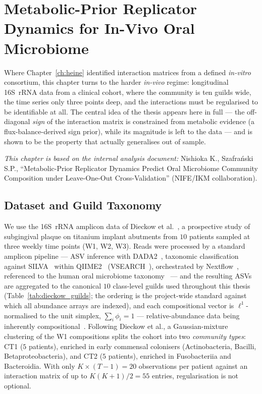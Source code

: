 \chapter{Metabolic-Prior Replicator Dynamics for In-Vivo Oral Microbiome}
\label{ch:dieckow}

Where Chapter~\ref{ch:heine} identified interaction matrices from a defined
\emph{in-vitro} consortium, this chapter turns to the harder \emph{in-vivo}
regime: longitudinal 16S~rRNA data from a clinical cohort, where the community is
ten guilds wide, the time series only three points deep, and the interactions must
be regularised to be identifiable at all. The central idea of the thesis appears
here in full --- the off-diagonal \emph{sign} of the interaction matrix is
constrained from metabolic evidence (a flux-balance-derived sign prior), while its
magnitude is left to the data --- and is shown to be the property that actually
generalises out of sample.

\medskip\noindent\textit{This chapter is based on the internal analysis document:}
Nishioka K., Szafra\'{n}ski S.P., ``Metabolic-Prior Replicator Dynamics Predict
Oral Microbiome Community Composition under Leave-One-Out Cross-Validation''
(NIFE/IKM collaboration).

\section{Dataset and Guild Taxonomy}
\label{sec:dieckow_data}

We use the 16S~rRNA amplicon data of Dieckow et al.~\cite{dieckow2024}, a
prospective study of subgingival plaque on titanium implant abutments from
$10$ patients sampled at three weekly time points (W1, W2, W3). Reads were
processed by a standard amplicon pipeline --- ASV inference with DADA2~\cite{Callahan2016DADA2},
taxonomic classification against SILVA~\cite{Quast2013SILVA, Bokulich2018FeatureClassifier, Robeson2021RESCRIPt} within
QIIME2~\cite{Bolyen2019QIIME2} (VSEARCH~\cite{Rognes2016VSEARCH}), orchestrated by Nextflow~\cite{DiTommaso2017Nextflow}, referenced to the
human oral microbiome taxonomy~\cite{Dewhirst2010HOMD} --- and the resulting ASVs are
aggregated to the canonical $10$ class-level guilds used throughout this thesis
(Table~\ref{tab:dieckow_guilds}; the ordering is the project-wide standard against
which all abundance arrays are indexed), and each compositional vector is
$\ell^1$-normalised to the unit simplex, $\sum_i\phi_i=1$ --- relative-abundance data
being inherently compositional~\cite{Aitchison1982Compositional, Aitchison1986Compositional, PawlowskyGlahn2015Compositional, Gloor2017Microbiome}. Following
Dieckow et al., a Gaussian-mixture clustering of the W1 compositions splits the
cohort into two \emph{community types}: CT1 ($5$ patients), enriched in early
commensal colonisers (Actinobacteria, Bacilli, Betaproteobacteria), and CT2
($5$ patients), enriched in Fusobacteriia and Bacteroidia. With only
$K\times(T-1)=20$ observations per patient against an interaction matrix of up to
$K(K{+}1)/2=55$ entries, regularisation is not optional.

